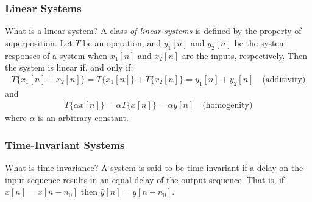 \documentclass[mathserif,9pt,handout]{beamer}
\begin{document}
\begin{frame}\frametitle{Linear Systems}\small
  \begin{block}{What is a linear system?}
    A class {\em of linear systems} is defined by the property of superposition. Let $T$ be an operation, and $y_1[n]$ and $y_2[n]$ be the system responses of a system when $x_1[n]$ and $x_2[n]$ are the inputs, respectively. Then the system is linear if, and only if: 
    \begin{align}
      T\{x_1[n] + x_2[n]\} = T\{x_1[n]\} + T\{x_2[n]\} = y_1[n] + y_2[n]  \hspace{1em} \textrm{(additivity)}
      \nonumber
    \end{align}
    and 
    \begin{align}
      T\{ \alpha x[n]\} = \alpha T\{  x[n]\} = \alpha y[n] \hspace{1em} \textrm{(homogenity)}
      \nonumber
    \end{align}
    where $\alpha$ is an arbitrary constant. 
  \end{block}
  
\end{frame}

\begin{frame}\frametitle{Time-Invariant Systems}\small
  \begin{block}{What is time-invariance?}
    A system is said to be time-invariant if a delay on the input sequence results in an equal delay of the output sequence. That is, if $\hat{x}[n] = x[n-n_0]$ then $\hat{y}[n] = y[n-n_0]$. 
  \end{block}
  
\end{frame}
\end{document}
